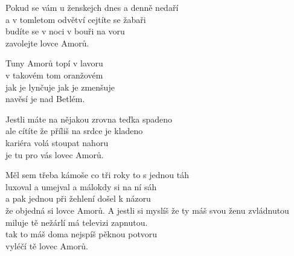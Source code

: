 \ve
{}Pokud se vám u ženskejch dnes a denně nedaří\\
a v tomletom odvětví cejtíte se žabaři\\
budíte se v noci v bouři na voru\\
zavolejte lovce Amorů.

\cho
Tuny Amorů topí v lavoru\\
v takovém tom oranžovém\\
jak je lynčuje jak je zmenšuje\\
navěsí je nad Betlém. 

\ve
Jestli máte na nějakou zrovna teďka spadeno\\
ale cítíte že příliš na srdce je kladeno\\
kariéra volá stoupat nahoru\\
je tu pro vás lovec Amorů.

\ve
Měl sem třeba kámoše co tři roky to s jednou táh\\
luxoval a umejval a málokdy si na ní sáh\\
a pak jednou při žehlení došel k názoru\\
že objedná si lovce Amorů.
\ve
A jestli si myslíš že ty máš svou ženu zvládnutou\\
miluje tě nežárlí má televizi zapnutou.\\
tak to máš doma nejspíš pěknou potvoru\\
vyléčí tě lovec Amorů.

\esong
